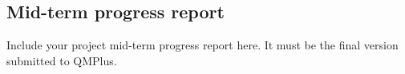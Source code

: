 \subsection*{Mid-term progress report}

Include your project mid-term progress report here. It must be the final version submitted to QMPlus.%



% 